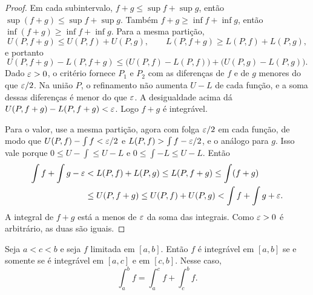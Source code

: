 \documentclass[11pt,a4paper]{article}
\begin{document}
\begin{proof}
Em cada subintervalo, $f+g\le\sup f+\sup g$, então $\sup(f+g)\le\sup f+\sup g$. Também $f+g\ge\inf f+\inf g$, então $\inf(f+g)\ge\inf f+\inf g$. Para a mesma partição,
\[
U(P,f+g)\le U(P,f)+U(P,g),\qquad
L(P,f+g)\ge L(P,f)+L(P,g),
\]
e portanto
\[
U(P,f+g)-L(P,f+g)\le\bigl(U(P,f)-L(P,f)\bigr)+\bigl(U(P,g)-L(P,g)\bigr).
\]
Dado $\varepsilon>0$, o critério fornece $P_1$ e $P_2$ com as diferenças de $f$ e de $g$ menores do que $\varepsilon/2$. Na união $P$, o refinamento não aumenta $U-L$ de cada função, e a soma dessas diferenças é menor do que $\varepsilon$. A desigualdade acima dá $U(P,f+g)-L(P,f+g)<\varepsilon$. Logo $f+g$ é integrável.

Para o valor, use a mesma partição, agora com folga $\varepsilon/2$ em cada função, de modo que $U(P,f)-\int f<\varepsilon/2$ e $L(P,f)>\int f-\varepsilon/2$, e o análogo para $g$. Isso vale porque $0\le U-\int\le U-L$ e $0\le\int-L\le U-L$. Então
\begin{align*}
\int f+\int g-\varepsilon
&<L(P,f)+L(P,g)
\le L(P,f+g)
\le\int(f+g)\\
&\le U(P,f+g)
\le U(P,f)+U(P,g)
<\int f+\int g+\varepsilon.
\end{align*}
A integral de $f+g$ está a menos de $\varepsilon$ da soma das integrais. Como $\varepsilon>0$ é arbitrário, as duas são iguais.
\end{proof}

\begin{teorema}\label{teo:aditiva}
Seja $a<c<b$ e seja $f$ limitada em $[a,b]$. Então $f$ é integrável em $[a,b]$ se e somente se é integrável em $[a,c]$ e em $[c,b]$. Nesse caso,
\[
\int_a^b f=\int_a^c f+\int_c^b f.
\]
\end{teorema}
\end{document}
